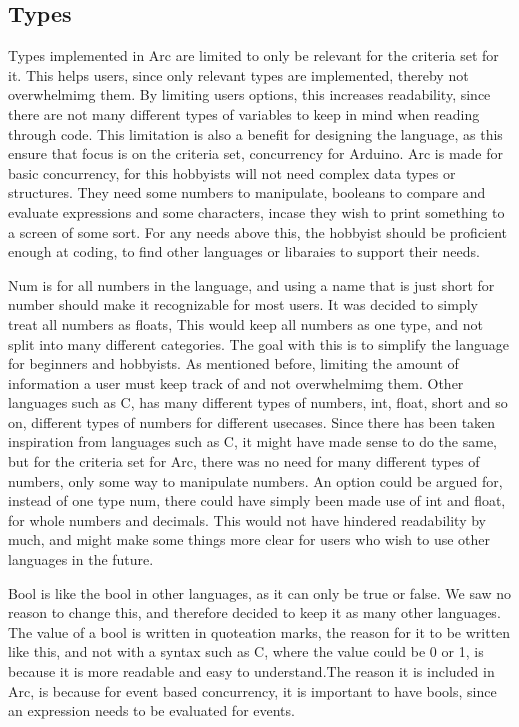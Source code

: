 \subsection{Types}
Types implemented in Arc are limited to only be relevant for the criteria set for it. This helps users, since only relevant types are implemented, thereby not overwhelmimg them. By limiting users options, this increases readability, since there are not many different types of variables to keep in mind when reading through code. This limitation is also a benefit for designing the language, as this ensure that focus is on the criteria set, concurrency for Arduino.
Arc is made for basic concurrency, for this hobbyists will not need complex data types or structures. They need some numbers to manipulate, booleans to compare and evaluate expressions and some characters, incase they wish to print something to a screen of some sort. For any needs above this, the hobbyist should be proficient enough at coding, to find other languages or libaraies to support their needs.

Num is for all numbers in the language, and using a name that is just short for number should make it recognizable for most users. It was decided to simply treat all numbers as floats, This would keep all numbers as one type, and not split into many different categories. The goal with this is to simplify the language for beginners and hobbyists. As mentioned before, limiting the amount of information a user must keep track of and not overwhelmimg them. Other languages such as C, has many different types of numbers, int, float, short and so on, different types of numbers for different usecases. Since there has been taken inspiration from languages such as C, it might have made sense to do the same, but for the criteria set for Arc, there was no need for many different types of numbers, only some way to manipulate numbers.
An option could be argued for, instead of one type num, there could have simply been made use of int and float, for whole numbers and decimals. This would not have hindered readability by much, and might make some things more clear for users who wish to use other languages in the future.

Bool is like the bool in other languages, as it can only be true or false. We saw no reason to change this, and therefore decided to keep it as many other languages. The value of a bool is written in quoteation marks, the reason for it to be written like this, and not with a syntax such as C, where the value could be 0 or 1, is because it is more readable and easy to understand.The reason it is included in Arc, is because for event based concurrency, it is important to have bools, since an expression needs to be evaluated for events.

